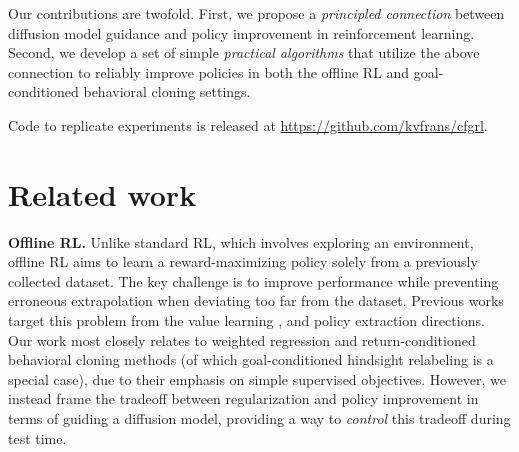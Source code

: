 \documentclass{article}
\begin{document}
Our contributions are twofold. First, we propose a \textit{principled connection} between diffusion model guidance and policy improvement in reinforcement learning. Second, we develop a set of simple \textit{practical algorithms} that utilize the above connection to reliably improve policies in both the offline RL and goal-conditioned behavioral cloning settings.

Code to replicate experiments is released at \url{https://github.com/kvfrans/cfgrl}.



















\section{Related work}

\textbf{Offline RL.} Unlike standard RL, which involves exploring an environment, offline RL aims to learn a reward-maximizing policy solely from a previously collected dataset. The key challenge is to improve performance while preventing erroneous extrapolation when deviating too far from the dataset. Previous works target this problem from the value learning \citep{cql_kumar2020, iql_kostrikov2022, sql_xu2023, xql_garg2023, edac_an2021, sacrnd_nikulin2023}, and policy extraction \citep{brac_wu2019, td3bc_fujimoto2021, rebrac_tarasov2023, fql_park2025, awr_peng2019, awac_nair2020, sfbc_chen2023, idql_hansenestruch2023} directions. Our work most closely relates to weighted regression \citep{awr_peng2019, awac_nair2020} and return-conditioned behavioral cloning \citep{rcp_kumar2019, dt_chen2021, qdt_yamagata2023} methods (of which goal-conditioned hindsight relabeling \citep{her_andrychowicz2017, gcsl_ghosh2021, rvs_emmons2022, ocbc_eysenbach2022} is a special case), due to their emphasis on simple supervised objectives. However, we instead frame the tradeoff between regularization and policy improvement in terms of guiding a diffusion model, providing a way to \textit{control} this tradeoff during test time.
\end{document}
